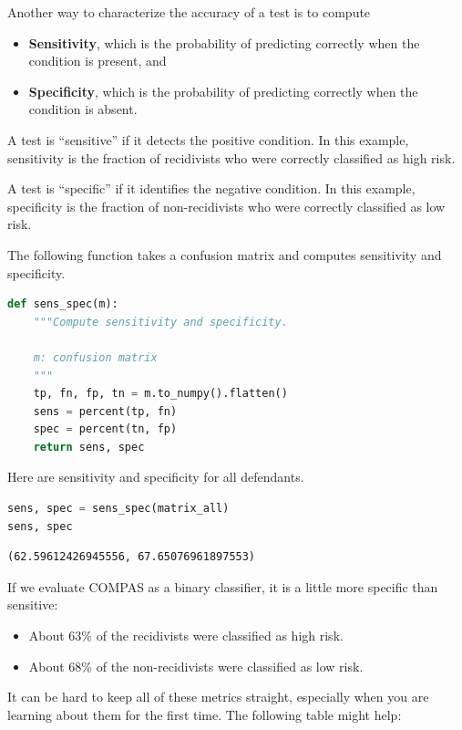 Another way to characterize the accuracy of a test is to compute

\begin{itemize}
\item
  \textbf{Sensitivity}, which is the probability of predicting correctly
  when the condition is present, and
\item
  \textbf{Specificity}, which is the probability of predicting correctly
  when the condition is absent.
\end{itemize}

A test is ``sensitive'' if it detects the positive condition. In this
example, sensitivity is the fraction of recidivists who were correctly
classified as high risk.

A test is ``specific'' if it identifies the negative condition. In this
example, specificity is the fraction of non-recidivists who were
correctly classified as low risk.

The following function takes a confusion matrix and computes sensitivity
and specificity.

\begin{lstlisting}[language=Python,style=source]
def sens_spec(m):
    """Compute sensitivity and specificity.

    m: confusion matrix
    """
    tp, fn, fp, tn = m.to_numpy().flatten()
    sens = percent(tp, fn)
    spec = percent(tn, fp)
    return sens, spec
\end{lstlisting}

Here are sensitivity and specificity for all defendants.

\begin{lstlisting}[language=Python,style=source]
sens, spec = sens_spec(matrix_all)
sens, spec
\end{lstlisting}

\begin{lstlisting}[style=output]
(62.59612426945556, 67.65076961897553)
\end{lstlisting}

If we evaluate COMPAS as a binary classifier, it is a little more
specific than sensitive:

\begin{itemize}
\item
  About 63\% of the recidivists were classified as high risk.
\item
  About 68\% of the non-recidivists were classified as low risk.
\end{itemize}

It can be hard to keep all of these metrics straight, especially when
you are learning about them for the first time. The following table
might help:

